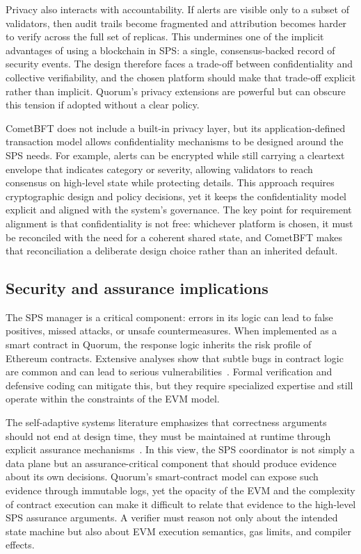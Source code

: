 Privacy also interacts with accountability. If alerts are visible only to a subset of validators, then audit trails become fragmented and attribution becomes harder to verify across the full set of replicas. This undermines one of the implicit advantages of using a blockchain in SPS: a single, consensus-backed record of security events. The design therefore faces a trade-off between confidentiality and collective verifiability, and the chosen platform should make that trade-off explicit rather than implicit. Quorum's privacy extensions are powerful but can obscure this tension if adopted without a clear policy.

CometBFT does not include a built-in privacy layer, but its application-defined transaction model allows confidentiality mechanisms to be designed around the SPS needs. For example, alerts can be encrypted while still carrying a cleartext envelope that indicates category or severity, allowing validators to reach consensus on high-level state while protecting details. This approach requires cryptographic design and policy decisions, yet it keeps the confidentiality model explicit and aligned with the system's governance. The key point for requirement alignment is that confidentiality is not free: whichever platform is chosen, it must be reconciled with the need for a coherent shared state, and CometBFT makes that reconciliation a deliberate design choice rather than an inherited default.

\subsection{Security and assurance implications}
The SPS manager is a critical component: errors in its logic can lead to false positives, missed attacks, or unsafe countermeasures. When implemented as a smart contract in Quorum, the response logic inherits the risk profile of Ethereum contracts. Extensive analyses show that subtle bugs in contract logic are common and can lead to serious vulnerabilities~\cite{atzei2017survey, kushwaha2022systematic}. Formal verification and defensive coding can mitigate this, but they require specialized expertise and still operate within the constraints of the EVM model.

The self-adaptive systems literature emphasizes that correctness arguments should not end at design time, they must be maintained at runtime through explicit assurance mechanisms~\cite{calinescu2017engineering, pekaric2023systematic}. In this view, the SPS coordinator is not simply a data plane but an assurance-critical component that should produce evidence about its own decisions. Quorum's smart-contract model can expose such evidence through immutable logs, yet the opacity of the EVM and the complexity of contract execution can make it difficult to relate that evidence to the high-level SPS assurance arguments. A verifier must reason not only about the intended state machine but also about EVM execution semantics, gas limits, and compiler effects.

